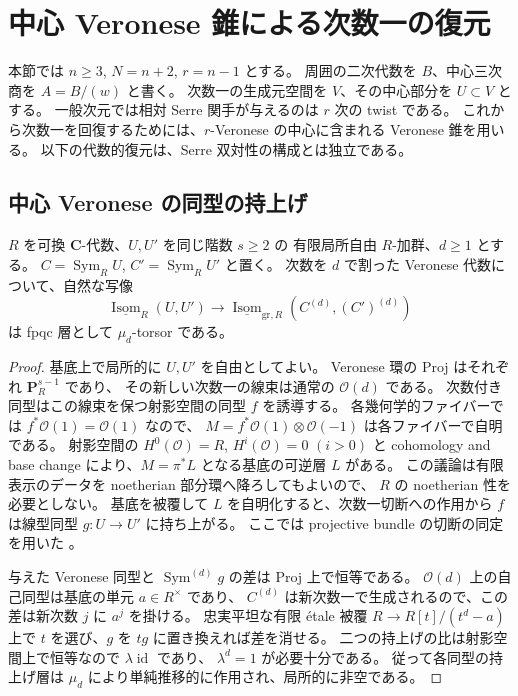 \section{中心 Veronese 錐による次数一の復元}
\label{sec:nfm-veronese}

本節では $n\geq3$, $N=n+2$, $r=n-1$ とする。
周囲の二次代数を $B$、中心三次商を $A=B/(w)$ と書く。
次数一の生成元空間を $V$、その中心部分を $U\subset V$ とする。
一般次元では相対 Serre 関手が与えるのは $r$ 次の twist である。
これから次数一を回復するためには、$r$-Veronese の中心に含まれる
Veronese 錐を用いる。
以下の代数的復元は、Serre 双対性の構成とは独立である。

\subsection{中心 Veronese の同型の持上げ}

\begin{lemma}
\label{lem:nfm-veronese-cone}
$R$ を可換 $\mathbf C$-代数、$U,U'$ を同じ階数 $s\geq2$ の
有限局所自由 $R$-加群、$d\geq1$ とする。
$C=\operatorname{Sym}_R U$, $C'=\operatorname{Sym}_R U'$ と置く。
次数を $d$ で割った Veronese 代数について、自然な写像
\[
 \underline{\operatorname{Isom}}_R(U,U')
 \longrightarrow
 \underline{\operatorname{Isom}}_{\mathrm{gr},R}(C^{(d)},(C')^{(d)})
\]
は fpqc 層として $\mu_d$-torsor である。
\end{lemma}

\begin{proof}
基底上で局所的に $U,U'$ を自由としてよい。
Veronese 環の Proj はそれぞれ $\mathbf P^{s-1}_R$ であり、
その新しい次数一の線束は通常の $\mathcal O(d)$ である。
次数付き同型はこの線束を保つ射影空間の同型 $f$ を誘導する。
各幾何学的ファイバーでは $f^*\mathcal O(1)=\mathcal O(1)$ なので、
$M=f^*\mathcal O(1)\otimes\mathcal O(-1)$ は各ファイバーで自明である。
射影空間の $H^0(\mathcal O)=R$, $H^i(\mathcal O)=0$ $(i>0)$ と
cohomology and base change により、$M=\pi^*L$ となる基底の可逆層 $L$ がある。
この議論は有限表示のデータを noetherian 部分環へ降ろしてもよいので、
$R$ の noetherian 性を必要としない。
基底を被覆して $L$ を自明化すると、次数一切断への作用から
$f$ は線型同型 $g:U\to U'$ に持ち上がる。
ここでは projective bundle の切断の同定を用いた
\cite[Section~27.21]{NFMStacksProjective}。

与えた Veronese 同型と $\operatorname{Sym}^{(d)}g$ の差は Proj 上で恒等である。
$\mathcal O(d)$ 上の自己同型は基底の単元 $a\in R^\times$ であり、
$C^{(d)}$ は新次数一で生成されるので、この差は新次数 $j$ に $a^j$ を掛ける。
忠実平坦な有限 \'etale 被覆
$R\to R[t]/(t^d-a)$ 上で $t$ を選び、$g$ を $tg$ に置き換えれば差を消せる。
二つの持上げの比は射影空間上で恒等なので $\lambda\operatorname{id}$ であり、
$\lambda^d=1$ が必要十分である。
従って各同型の持上げ層は $\mu_d$ により単純推移的に作用され、局所的に非空である。
\end{proof}


